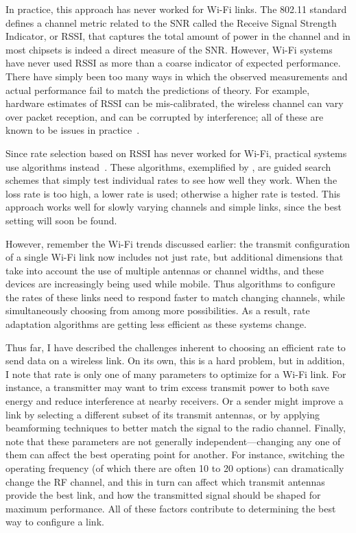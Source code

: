 In practice, this approach has never worked for Wi-Fi links. The 802.11 standard defines a channel metric related to the SNR called the Receive Signal Strength Indicator, or RSSI, that captures the total amount of power in the channel and in most chipsets is indeed a direct measure of the SNR. However, Wi-Fi systems have never used RSSI as more than a coarse indicator of expected performance. There have simply been too many ways in which the observed measurements and actual performance fail to match the predictions of theory. For example, hardware estimates of RSSI can be mis-calibrated, the wireless channel can vary over packet reception, and can be corrupted by interference; all of these are known to be issues in practice~\cite{Camp_rateadapt,Judd_CHARM,Reis_interference}.

Since rate selection based on RSSI has never worked for Wi-Fi, practical systems use  algorithms instead~\cite{Bicket_SampleRate,minstrel,Wong_RRAA}. These algorithms, exemplified by , are guided search schemes that simply test individual rates to see how well they work. When the loss rate is too high, a lower rate is used; otherwise a higher rate is tested. This approach works well for slowly varying channels and simple links, since the best setting will soon be found.

However, remember the Wi-Fi trends discussed earlier: the transmit configuration of a single Wi-Fi link now includes not just rate, but additional dimensions that take into account the use of multiple antennas or channel widths, and these devices are increasingly being used while mobile. Thus algorithms to configure the rates of these links need to respond faster to match changing channels, while simultaneously choosing from among more possibilities. As a result, rate adaptation algorithms are getting less efficient as these systems change.

Thus far, I have described the challenges inherent to choosing an efficient rate to send data on a wireless link. On its own, this is a hard problem, but in addition, I note that rate is only one of many parameters to optimize for a Wi-Fi link. For instance, a transmitter may want to trim excess transmit power to both save energy and reduce interference at nearby receivers. Or a sender might improve a link by selecting a different subset of its transmit antennas, or by applying beamforming techniques to better match the signal to the radio channel. Finally, note that these parameters are not generally independent---changing any one of them can affect the best operating point for another. For instance, switching the operating frequency (of which there are often 10 to 20 options) can dramatically change the RF channel, and this in turn can affect which transmit antennas provide the best link, and how the transmitted signal should be shaped for maximum performance. All of these factors contribute to determining the best way to configure a link.


